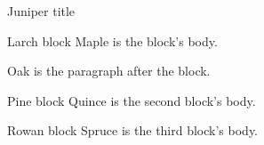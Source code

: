 \documentclass{beamer}
\begin{document}
\begin{frame}[t]{Juniper title}
\begin{block}{Larch block}
Maple is the block's body.
\end{block}
Oak is the paragraph after the block.
\begin{block}{Pine block}
Quince is the second block's body.
\end{block}
\begin{block}{Rowan block}
Spruce is the third block's body.
\end{block}
\end{frame}
\end{document}
